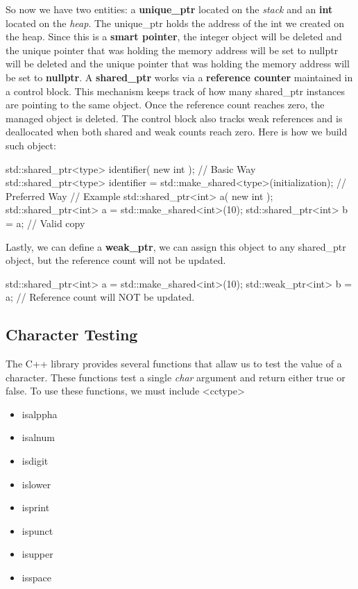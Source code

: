 \documentclass{report}
\begin{document}
    \bigbreak \noindent 
    So now we have two entities: a \textbf{unique\_ptr} located on the \textit{stack} and an \textbf{int} located on the \textit{heap}. The unique\_ptr holds the address of the int we created on the heap. Since this is a \textbf{smart pointer}, the integer object will be deleted and the unique pointer that was holding the memory address will be set to nullptr will be deleted and the unique pointer that was holding the memory address will be set to \textbf{nullptr}.
    \bigbreak \noindent 
    A \textbf{shared\_ptr} works via a \textbf{reference counter} maintained in a control block. This mechanism keeps track of how many shared\_ptr instances are pointing to the same object. Once the reference count reaches zero, the managed object is deleted. The control block also tracks weak references and is deallocated when both shared and weak counts reach zero. Here is how we build such object:
    \bigbreak \noindent 
    
    \begin{cppcode}
std::shared_ptr<type> identifier( new int ); // Basic Way
std::shared_ptr<type> identifier = std::make_shared<type>(initialization); // Preferred Way
// Example
std::shared_ptr<int> a( new int );
std::shared_ptr<int> a = std::make_shared<int>(10);
std::shared_ptr<int> b = a; // Valid copy
    \end{cppcode}
    

    \bigbreak \noindent 
    Lastly, we can define a \textbf{weak\_ptr}, we can assign this object to any shared\_ptr object, but the reference count will not be updated.
    \bigbreak \noindent 
    
    \begin{cppcode}
std::shared_ptr<int> a = std::make_shared<int>(10);
std::weak_ptr<int> b = a; // Reference count will NOT be updated.
    \end{cppcode}
    

    \pagebreak
    \bigbreak \noindent 
    \subsection{Character Testing}
    \bigbreak \noindent 
    The C++ library provides several functions that allaw us to test the value of a character. These functions test a single \textit{char} argument and return either true or false.
    \bigbreak \noindent 
    To use these functions, we must include <cctype>
    \begin{itemize}
        \item isalppha
        \item isalnum
        \item isdigit
        \item islower
        \item isprint
        \item ispunct
        \item isupper
        \item isspace
    \end{itemize}
\end{document}
